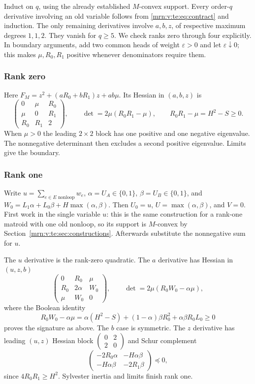 \documentclass[11pt,a4paper]{article}
\theoremstyle{remark}\newtheorem{remark}[theorem]{Remark}
\begin{document}
Induct on $q$, using the already established $M$-convex support. Every order-$q$ derivative involving an old variable follows from \eqref{mrn:v:te:eq:contract} and induction. The only remaining derivatives involve $a,b,z$, of respective maximum degrees $1,1,2$. They vanish for $q\ge5$. We check ranks zero through four explicitly. In boundary arguments, add two common heads of weight $\varepsilon>0$ and let $\varepsilon\downarrow0$; this makes $\mu,R_0,R_1$ positive whenever denominators require them.

\subsubsection{Rank zero}
Here $F_M=z^2+(aR_0+bR_1)z+ab\mu$. Its Hessian in $(a,b,z)$ is
\[
 \begin{pmatrix}0&\mu&R_0\\\mu&0&R_1\\R_0&R_1&2\end{pmatrix},
 \qquad \det=2\mu(R_0R_1-\mu),\qquad R_0R_1-\mu=H^2-S\ge0.
\]
When $\mu>0$ the leading $2\times2$ block has one positive and one negative eigenvalue. The nonnegative determinant then excludes a second positive eigenvalue. Limits give the boundary.

\subsubsection{Rank one}
Write $u=\sum_{e\in E\text{ nonloop}}w_e$, $\alpha=U_A\in\{0,1\}$, $\beta=U_B\in\{0,1\}$, and
$W_0=L_1\alpha+L_0\beta+H\max(\alpha,\beta)$. Then $U_0=u$, $U=\max(\alpha,\beta)$, and $V=0$. First work in the single variable $u$: this is the same construction for a rank-one matroid with one old nonloop, so its support is $M$-convex by Section~\ref{mrn:v:te:sec:constructions}. Afterwards substitute the nonnegative sum for $u$.

The $u$ derivative is the rank-zero quadratic. The $a$ derivative has Hessian in $(u,z,b)$
\[
 \begin{pmatrix}0&R_0&\mu\\R_0&2\alpha&W_0\\\mu&W_0&0\end{pmatrix},
 \qquad \det=2\mu(R_0W_0-\alpha\mu),
\]
where the Boolean identity
\[
 R_0W_0-\alpha\mu
 =\alpha(H^2-S)+(1-\alpha)\beta R_0^2+\alpha\beta R_0L_0\ge0
\]
proves the signature as above. The $b$ case is symmetric. The $z$ derivative has leading $(u,z)$ Hessian block $\left(\begin{smallmatrix}0&2\\2&0\end{smallmatrix}\right)$ and Schur complement
\[
 \begin{pmatrix}-2R_0\alpha&-H\alpha\beta\\-H\alpha\beta&-2R_1\beta\end{pmatrix}\preceq0,
\]
since $4R_0R_1\ge H^2$. Sylvester inertia and limits finish rank one.
\end{document}
